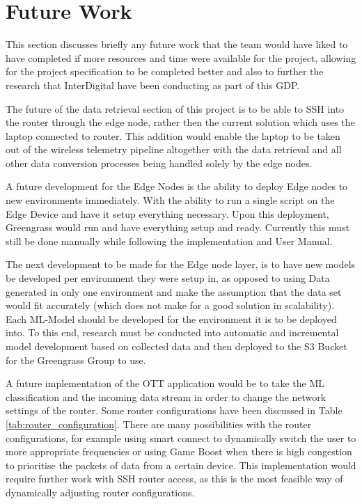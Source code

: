 
\chapter{Future Work} \label{Chapter:Future Work} %

This section discusses briefly any future work that the team would have liked to have completed if more resources and time were available for the project, allowing for the project specification to be completed better and also to further the research that InterDigital have been conducting as part of this GDP.

The future of the data retrieval section of this project is to be able to SSH into the router through the edge node, rather then the current solution which uses the laptop connected to router. This addition would enable the laptop to be taken out of the wireless telemetry pipeline altogether with the data retrieval and all other data conversion processes being handled solely by the edge nodes. 

A future development for the Edge Nodes is the ability to deploy Edge nodes to new environments immediately. With the ability to run a single script on the Edge Device and have it setup everything necessary. Upon this deployment, Greengrass would run and have everything setup and ready. Currently this must still be done manually while following the implementation and User Manual.

The next development to be made for the Edge node layer, is to have new models be developed per environment they were setup in, as opposed to using Data generated in only one environment and make the assumption that the data set would fit accurately (which does not make for a good solution in scalability). Each ML-Model should be developed for the environment it is to be deployed into. To this end, research must be conducted into automatic and incremental model development based on collected data and then deployed to the S3 Bucket for the Greengrass Group to use. 


A future implementation of the OTT application would be to take the ML classification and the incoming data stream in order to change the network settings of the router. Some router configurations have been discussed in Table \ref{tab:router_configuration}. There are many possibilities with the router configurations, for example using smart connect to dynamically switch the user to more appropriate frequencies or using Game Boost when there is high congestion to prioritise the packets of data from a certain device. This implementation would require further work with SSH router access, as this is the most feasible way of dynamically adjusting router configurations. 

